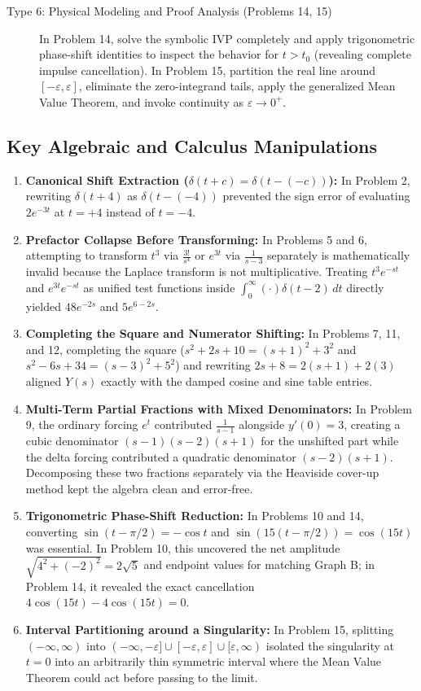 \documentclass[11pt, letterpaper]{article}
\theoremstyle{definition}
\theoremstyle{remark}
\begin{document}
\begin{description}
    \item[Type 6: Physical Modeling and Proof Analysis (Problems 14, 15)]
    In Problem 14, solve the symbolic IVP completely and apply trigonometric phase-shift identities to inspect the behavior for $t > t_0$ (revealing complete impulse cancellation). In Problem 15, partition the real line around $[-\varepsilon, \varepsilon]$, eliminate the zero-integrand tails, apply the generalized Mean Value Theorem, and invoke continuity as $\varepsilon \to 0^+$.
\end{description}

\subsection{Key Algebraic and Calculus Manipulations}
\begin{enumerate}
    \item \textbf{Canonical Shift Extraction ($\delta(t + c) = \delta(t - (-c))$):} In Problem 2, rewriting $\delta(t + 4)$ as $\delta(t - (-4))$ prevented the sign error of evaluating $2e^{-3t}$ at $t = +4$ instead of $t = -4$.
    \item \textbf{Prefactor Collapse Before Transforming:} In Problems 5 and 6, attempting to transform $t^3$ via $\frac{3!}{s^4}$ or $e^{3t}$ via $\frac{1}{s-3}$ separately is mathematically invalid because the Laplace transform is not multiplicative. Treating $t^3 e^{-st}$ and $e^{3t} e^{-st}$ as unified test functions inside $\int_0^\infty (\cdot)\delta(t - 2)\,dt$ directly yielded $48e^{-2s}$ and $5e^{6-2s}$.
    \item \textbf{Completing the Square and Numerator Shifting:} In Problems 7, 11, and 12, completing the square ($s^2 + 2s + 10 = (s+1)^2 + 3^2$ and $s^2 - 6s + 34 = (s-3)^2 + 5^2$) and rewriting $2s + 8 = 2(s+1) + 2(3)$ aligned $Y(s)$ exactly with the damped cosine and sine table entries.
    \item \textbf{Multi-Term Partial Fractions with Mixed Denominators:} In Problem 9, the ordinary forcing $e^t$ contributed $\frac{1}{s-1}$ alongside $y'(0) = 3$, creating a cubic denominator $(s-1)(s-2)(s+1)$ for the unshifted part while the delta forcing contributed a quadratic denominator $(s-2)(s+1)$. Decomposing these two fractions separately via the Heaviside cover-up method kept the algebra clean and error-free.
    \item \textbf{Trigonometric Phase-Shift Reduction:} In Problems 10 and 14, converting $\sin(t - \pi/2) = -\cos t$ and $\sin(15(t - \pi/2)) = \cos(15t)$ was essential. In Problem 10, this uncovered the net amplitude $\sqrt{4^2 + (-2)^2} = 2\sqrt{5}$ and endpoint values for matching Graph B; in Problem 14, it revealed the exact cancellation $4\cos(15t) - 4\cos(15t) = 0$.
    \item \textbf{Interval Partitioning around a Singularity:} In Problem 15, splitting $(-\infty, \infty)$ into $(-\infty, -\varepsilon] \cup [-\varepsilon, \varepsilon] \cup [\varepsilon, \infty)$ isolated the singularity at $t = 0$ into an arbitrarily thin symmetric interval where the Mean Value Theorem could act before passing to the limit.
\end{enumerate}
\end{document}
